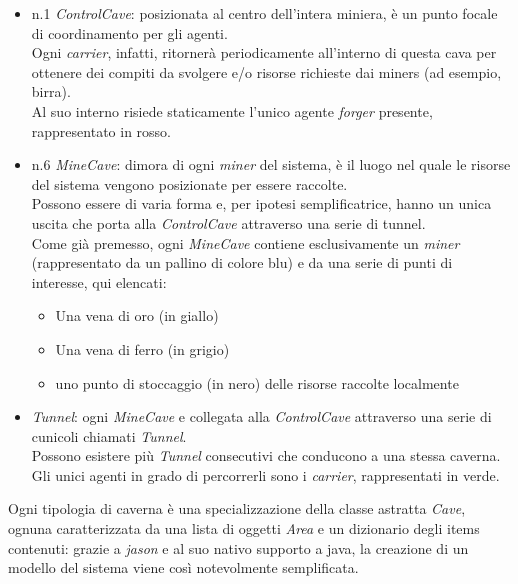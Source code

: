 \documentclass{llncs}
\begin{document}
\begin{itemize}
	\item n.1 \textit{ControlCave}: posizionata al centro dell'intera miniera, è un punto focale di coordinamento per gli agenti.\\
	Ogni \textit{carrier}, infatti, ritornerà periodicamente all'interno di questa cava per ottenere dei compiti da svolgere e/o risorse richieste dai miners (ad esempio, birra).\\Al suo interno risiede staticamente l'unico agente \textit{forger} presente, rappresentato in rosso.\\
	\item n.6 \textit{MineCave}: dimora di ogni \textit{miner} del sistema, è il luogo nel quale le risorse del sistema vengono posizionate per essere raccolte.\\ Possono essere di varia forma e, per ipotesi semplificatrice, hanno un unica uscita che porta alla \textit{ControlCave} attraverso una serie di tunnel.\\
	Come già premesso, ogni \textit{MineCave} contiene esclusivamente un \textit{miner} (rappresentato da un pallino di colore blu) e da una serie di punti di interesse, qui elencati:
	\begin{itemize}
		\item Una vena di oro (in giallo)
		\item Una vena di ferro (in grigio)
		\item uno punto di stoccaggio (in nero) delle risorse raccolte localmente
	\end{itemize}\vspace*{0.4cm}
	
	\item \textit{Tunnel}: ogni \textit{MineCave} e collegata alla \textit{ControlCave} attraverso una serie di cunicoli chiamati \textit{Tunnel}.\\ Possono esistere più \textit{Tunnel} consecutivi che conducono a una stessa caverna.\\ Gli unici agenti in grado di percorrerli sono i \textit{carrier}, rappresentati in verde.
\end{itemize}
Ogni tipologia di caverna è una specializzazione della classe astratta \textit{Cave}, ognuna caratterizzata da una lista di oggetti \textit{Area} e un dizionario degli items contenuti: grazie a \textit{jason} e al suo nativo supporto a java, la creazione di un modello del sistema viene così notevolmente semplificata.\\
\end{document}
